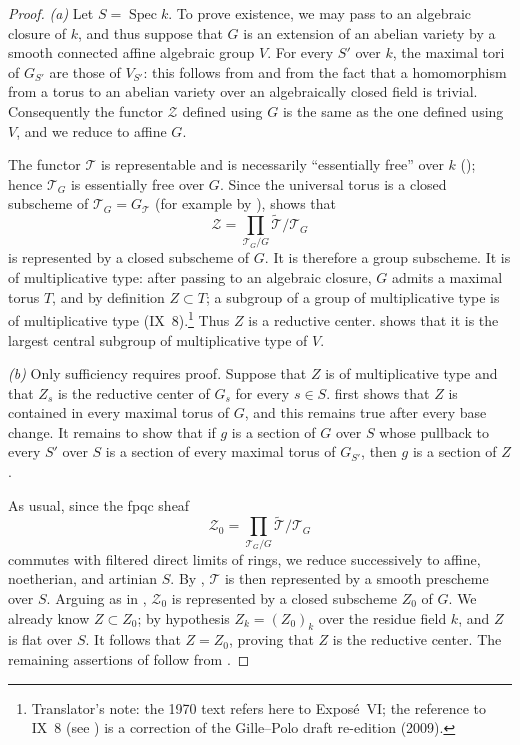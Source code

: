 \begin{proof}
\emph{(a)} Let \(S=\operatorname{Spec}k\). To prove existence, we
may pass to an algebraic closure of \(k\), and thus suppose that
\(G\) is an extension of an abelian variety by a smooth connected
affine algebraic group \(V\). For every \(S'\) over \(k\), the
maximal tori of \(G_{S'}\) are those of \(V_{S'}\): this follows
from  and from the fact that a homomorphism from a torus to an
abelian variety over an algebraically closed field is trivial.
Consequently the functor \(\mathcal Z\) defined using \(G\) is the
same as the one defined using \(V\), and we reduce to affine \(G\).

The functor \(\mathcal T\) is representable and is necessarily
``essentially free'' over \(k\) (); hence
\(\mathcal T_G\) is essentially free over \(G\). Since the universal
torus is a closed subscheme of
\(\mathcal T_G=G_{\mathcal T}\) (for example by ),
 shows that
\[
  \mathcal Z=
  \prod_{\mathcal T_G/G}
  \widetilde{\mathcal T}/\mathcal T_G
\]
is represented by a closed subscheme of \(G\). It is therefore a
group subscheme. It is of multiplicative type: after passing to an
algebraic closure, \(G\) admits a maximal torus \(T\), and by
definition \(Z\subset T\); a subgroup of a group of multiplicative
type is of multiplicative type (IX~8).\footnote{Translator's note: the 1970
text refers here to Exposé~VI; the reference to IX~8 (see
) is a correction of the Gille--Polo
draft re-edition (2009).} Thus \(Z\) is a reductive
center.  shows that it is the largest central subgroup of
multiplicative type of \(V\).

\emph{(b)} Only sufficiency requires proof. Suppose that \(Z\) is
of multiplicative type and that \(Z_s\) is the reductive center of
\(G_s\) for every \(s\in S\).  first shows that \(Z\) is
contained in every maximal torus of \(G\), and this remains true
after every base change. It remains to show that if \(g\) is a
section of \(G\) over \(S\) whose pullback to every \(S'\) over
\(S\) is a section of every maximal torus of \(G_{S'}\), then \(g\)
is a section of \(Z\).

As usual, since the fpqc sheaf
\[
  \mathcal Z_0=
  \prod_{\mathcal T_G/G}
  \widetilde{\mathcal T}/\mathcal T_G
\]
commutes with filtered direct limits of rings, we reduce successively
to affine, noetherian, and artinian \(S\). By ,
\(\mathcal T\) is then represented by a smooth prescheme over \(S\).
Arguing as in \textup{}, \(\mathcal Z_0\) is represented by a
closed subscheme \(Z_0\) of \(G\). We already know \(Z\subset Z_0\);
by hypothesis \(Z_k=(Z_0)_k\) over the residue field \(k\), and
\(Z\) is flat over \(S\). It follows that \(Z=Z_0\), proving that
\(Z\) is the reductive center. The remaining assertions of
\textup{} follow from .


\end{proof}
